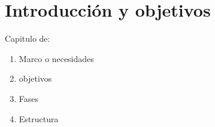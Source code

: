 \chapter{Introducción y objetivos}

Capitulo de:

\begin{enumerate}
    \item Marco o necesidades
    \item objetivos
    \item Fases
    \item Estructura
\end{enumerate}